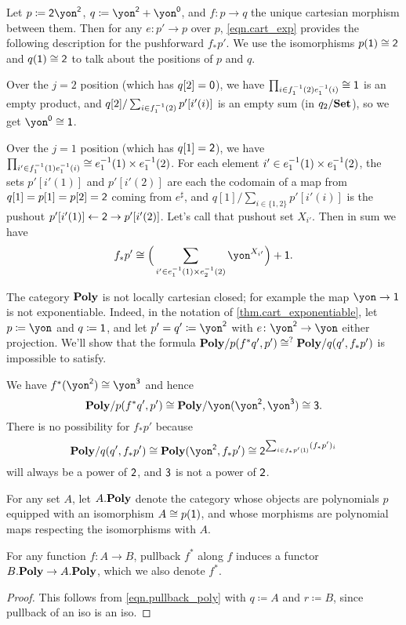 \documentclass[Book-Poly]{subfiles}
\begin{document}
\begin{example}
Let $p\coloneqq\2\yon^\2$, $q\coloneqq\yon^\2+\yon^\0$, and $f\colon p\to q$ the unique cartesian morphism between them. Then for any $e\colon p'\to p$ over $p$, \eqref{eqn.cart_exp} provides the following description for the pushforward $f_*p'$. We use the isomorphisms $p(\1)\cong\2$ and $q(\1)\cong\2$ to talk about the positions of $p$ and $q$.

Over the $j=2$ position (which has $q[2]=\0$), we have $\prod_{i\in f_1\inv(2)e_1\inv(i)}\cong\1$ is an empty product, and $q[2]/\sum_{i\in f_1\inv(2)}p'[i'(i)]$ is an empty sum (in $q_2/\smset$), so we get $\yon^\0\cong\1$.

Over the $j=1$ position (which has $q[1]=\2$), we have $\prod_{i'\in f_1\inv(1)e_1\inv(i)}\cong e_1\inv(1)\times e_1\inv(2)$. For each element $i'\in e_1\inv(1)\times e_1\inv(2)$, the sets $p'[i'(1)]$ and $p'[i'(2)]$ are each the codomain of a map from $q[1]=p[1]=p[2]=\2$ coming from $e^\sharp$, and $q[1]/\sum_{i\in\{1,2\}}p'[i'(i)]$ is the pushout $p'[i'(1)]\from\2\to p'[i'(2)]$. Let's call that pushout set $X_{i'}$. Then in sum we have
\[
f_*p'\cong\Big(\sum_{i'\in e_1\inv(1)\times e_2\inv(2)}\yon^{X_{i'}}\Big)+\1.
\]
\end{example}

\begin{remark}
The category $\poly$ is not locally cartesian closed; for example the map $\yon\to\1$ is not exponentiable. Indeed, in the notation of \cref{thm.cart_exponentiable}, let $p\coloneqq\yon$ and $q\coloneqq\1$, and let $p'=q'\coloneqq\yon^\2$ with $e\colon\yon^\2\to\yon$ either projection. We'll show that the formula $\poly/p(f^*q',p')\cong^?\poly/q(q',f_*p')$ is impossible to satisfy.

We have $f^*(\yon^\2)\cong\yon^\3$ and hence
\[\poly/p(f^*q',p')\cong\poly/\yon(\yon^\2,\yon^\3)\cong\3.\]
There is no possibility for $f_*p'$ because
\[
\poly/q(q',f_*p')\cong\poly(\yon^\2,f_*p')\cong\2^{\sum_{i\in f_*p'(\1)}(f_*p')_i}
\]
will always be a power of $\2$, and $\3$ is not a power of $\2$.
\end{remark}

For any set $A$, let $\poly[A.]$ denote the category whose objects are polynomials $p$ equipped with an isomorphism $A\cong p(\1)$, and whose morphisms are polynomial maps respecting the isomorphisms with $A$.

\begin{proposition}\label{prop.basechange}
For any function $f\colon A\to B$, pullback $f^*$ along $f$ induces a functor $\poly[B.]\to\poly[A.]$, which we also denote $f^*$.
\end{proposition}
\begin{proof}
This follows from \eqref{eqn.pullback_poly} with $q\coloneqq A$ and $r\coloneqq B$, since pullback of an iso is an iso.
\end{proof}
\end{document}
